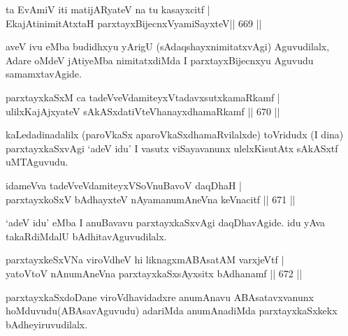 
\begin{shl}
ta EvAmiV iti matijARyateV na tu kasayxcitf | \\
EkajAtinimitAtx\s taH parxtayxBijecnxVyamiSayxteV\hfill ||  669 || 
\end{shl}

\begin{artha}
aveV ivu eMba budidhxyu yArigU (sAdaqshayxnimitatxvAgi) Aguvudilalx, Adare oMdeV jAtiyeMba nimitatxdiMda I parxtayxBijecnxyu Aguvudu samamxtavAgide.
\end{artha}

\begin{shl}
parxtayxkaSxM ca tadeVveVdamiteyxVtadavxsutxkamaRkamf | \\
ulilxKajAjxyateV sAkASxdatiVteV\s hanayxdhamaRkamf \hfill||  670 ||  
\end{shl}

\begin{artha}
kaLedadinadalilx (paroVkaSx aparoVkaSxdhamaRvilalxde) toVridudx (I dina) parxtayxkaSxvAgi `adeV idu' I vasutx viSayavanunx ulelxKisutAtx sAkASxtf uMTAguvudu.
\end{artha}


\begin{shl}
idameVva tadeVveVdamiteyxVSoV\s nuBavoV daqDhaH | \\
parxtayxkoSxV bAdhayxteV nAyamanumAneVna keVnacitf \hfill||  671 ||  
\end{shl}

\begin{artha}
`adeV idu' eMba I anuBavavu parxtayxkaSxvAgi daqDhavAgide. idu yAva takaRdiMdalU bAdhitavAguvudilalx.
\end{artha}


\begin{shl}
parxtayxkeSxVNa viroVdheV hi liknagxmABAsatAM varxjeVtf | \\
yatoV\s toV nAnumAneVna parxtayxkaSxsAyxsitx bAdhanamf \hfill||  672 ||  
\end{shl}

\begin{artha}
parxtayxkaSxdoDane viroVdhavidadxre anumAnavu ABAsatavxvanunx hoMduvudu(ABAsavAguvudu) adariMda anumAnadiMda parxtayxkaSxkekx bAdheyiruvudilalx.
\end{artha}

